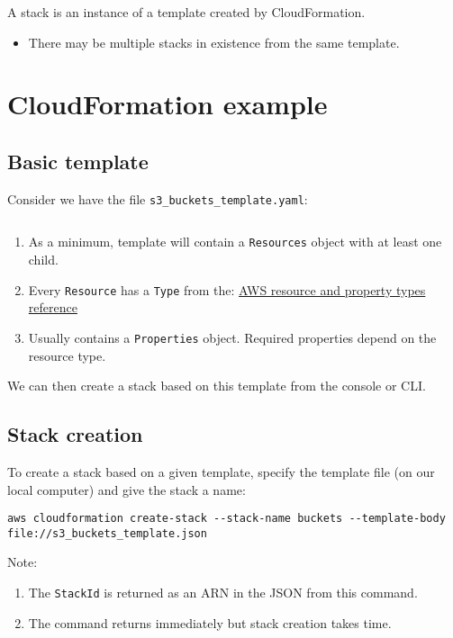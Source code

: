 \documentclass[slides]{pgnotes}
\begin{document}
A stack is an instance of a template created by CloudFormation.

\begin{itemize}

\item
  There may be multiple stacks in existence from the same template.
\end{itemize}


\section{CloudFormation example}\label{cloudformation-example}

\subsection{Basic template}\label{basic-template}

Consider we have the file \texttt{s3\_buckets\_template.yaml}:

\inputminted{yaml}{s3_buckets_template.yaml}

\begin{enumerate}
\item
  As a minimum, template will contain a \texttt{Resources} object with
  at least one child.
\item
  Every \texttt{Resource} has a \texttt{Type} from the:
  \href{https://docs.aws.amazon.com/AWSCloudFormation/latest/UserGuide/aws-template-resource-type-ref.html}{AWS
  resource and property types reference}
\item
  Usually contains a \texttt{Properties} object.
  Required properties depend on the resource type.
\end{enumerate}

We can then create a stack based on this template from the console or CLI.

\subsection{Stack creation}\label{stack-creation}

To create a stack based on a given template, specify the template file (on our local computer) and give the stack a name:

\begin{verbatim}
aws cloudformation create-stack --stack-name buckets --template-body file://s3_buckets_template.json
\end{verbatim}

Note:
\begin{enumerate}
\item The \texttt{StackId} is returned as an ARN in the JSON from this command.
\item The command returns immediately but stack creation takes time.
\end{enumerate}
\end{document}
